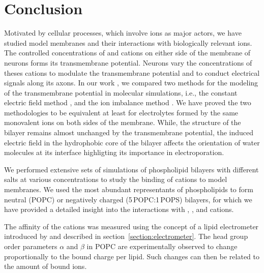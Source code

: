 \chapter*{Conclusion}

Motivated by cellular processes, 
which involve ions as major actors, 
we have studied model membranes and their interactions 
with biologically relevant ions. 
The controlled concentrations of  and  cations 
on either side of the membrane of neurons
forms its transmembrane potential. 
Neurons vary the concentrations of theses cations
to modulate the transmembrane potential 
and to conduct electrical signals along its axons. \citep{Knudsen_book2002, Storace2015, Sung2015}
In our work \citep{melcr16},
we compared two methods for the modeling of the transmembrane potential in molecular simulations, 
i.e., 
the constant electric field method \cite{Roux1997,Roux2008, gumbart_constant_2012}, 
and the ion imbalance method \cite{sachs04_potential, kutzner_computational_2011}. 
We have proved the two methodologies to be equivalent 
at least for electrolytes formed by the same monovalent ions on both sides of the membrane. 
While,
the structure of the bilayer remains almost unchanged by the transmembrane potential, 
the induced electric field in the hydrophobic core of the bilayer
affects the orientation of water molecules at its interface 
highligting its importance in electroporation. \citep{bu2017mechanics}


We performed extensive sets of simulations of phospholipid bilayers
with different salts at various concentrations
to study the binding of cations to model membranes. 
We used the most abundant representants of phospholipids
to form neutral (POPC) or negatively charged (5\,POPC:1\,POPS) bilayers, 
for which we have provided a detailed insight 
into the interactions with 
, , and  cations. 

The affinity of the cations 
was measured using the concept of a lipid electrometer 
introduced by \citet{seelig87} 
and described in section~\ref{section:electrometer}.
The head group order parameters $\alpha$ and $\beta$ in POPC
are experimentally observed to change
proportionally to the bound charge per lipid. 
Such changes can then be related to the amount of bound ions.

